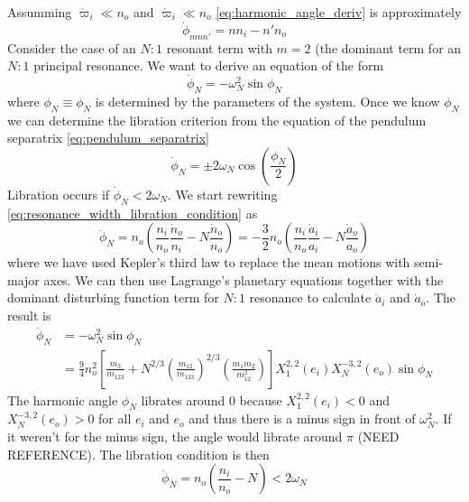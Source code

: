 Assumming $\dot{\varpi}_i\ll n_o$ and $\dot{\varpi}_i\ll n_o$ 
\cref{eq:harmonic_angle_deriv} is approximately
\begin{equation}
    \dot{\phi}_{mnn'}=nn_i-n'n_o
    \label{eq:resonance_width_libration_condition}
\end{equation}
Consider the case of an $N:1$ resonant term with $m=2$ (the dominant
term for an $N:1$ principal resonance. We want to derive an equation of
the form
\begin{equation}
    \dot{\phi}_{N}=-\omega_{N}^2\sin\phi_{N}
\end{equation}
where $\phi_{N}\equiv\phi_N$ is determined by the parameters of the system. Once 
we know $\phi_{N}$ we can determine the libration criterion from the
equation of the pendulum separatrix \ref{eq:pendulum_separatrix}
\begin{equation}
    \dot{\phi}_{N}=\pm 2\omega_{N}\cos\left( \frac{\phi_{N}}{2} \right)
\end{equation}
Libration occurs if $\dot{\phi}_{N}<2\omega_{N}$. 
We start rewriting \cref{eq:resonance_width_libration_condition} as
\begin{equation}
    \ddot{\phi}_{N}=n_o\left( \frac{n_i}{n_o} \frac{\dot{n}_o}{n_i} 
    -N \frac{\dot{n}_o}{n_o} \right)=- \frac{3}{2} n_o\left(
    \frac{n_i}{n_o} \frac{\dot{a}_i}{a_i} -N \frac{\dot{a}_o}{a_o} 
    \right)
\end{equation}
where we have used Kepler's third law to replace the mean motions with
semi-major axes. We can then use Lagrange's planetary equations 
together with the dominant disturbing function term for $N:1$ resonance
to calculate $\dot{a}_i$ and $\dot{a}_o$. The result is
\begin{equation}
\begin{aligned}
    \ddot{\phi}_{N}&=-\omega_{N}^2\sin\phi_{N}\\&= \frac{9}{4} 
    n_o^2\left[ \frac{m_3}{m_{123}} +
    N^{2/3}\left( \frac{m_{12}}{m_{123}}
    \right)^{2/3}\left( \frac{m_1m_2}{m_{12}^2} \right)\right]
    X^{2,2}_1(e_i)X^{-3,2}_N(e_o)\sin\phi_{N}
\end{aligned}
\end{equation}
The harmonic angle $\phi_N$ librates around $0$ because 
$X^{2,2}_1(e_i)<0$ and $X^{-3,2}_N(e_o)>0$ for all
$e_i$ and $e_o$ and thus there is a minus sign in front
of $\omega_N^2$. If it weren't for the minus sign, the 
angle would librate around $\pi$ (NEED REFERENCE).
The libration condition is then
\begin{equation}
    \dot{\phi}_N=n_o\left( \frac{n_i}{n_o} -N\right)<2\omega_N
\end{equation}
